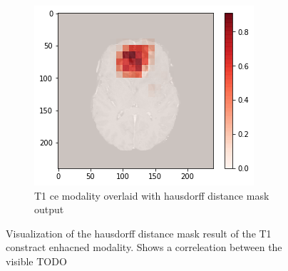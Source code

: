 \begin{figure}[H]
\begin{subfigure}{.33\textwidth}
    \end{subfigure}
        \begin{subfigure}{.33\textwidth}
        \centering
        \includegraphics[width=\linewidth]{chapters/07_brats3d/images/10_t1ce_hdm.png}
        \caption{T1 ce modality overlaid with hausdorff distance mask output}
    \end{subfigure}
    \caption{Visualization of the hausdorff distance mask result of the T1 constract enhacned modality. Shows a correleation between the visible TODO}
\end{figure}


